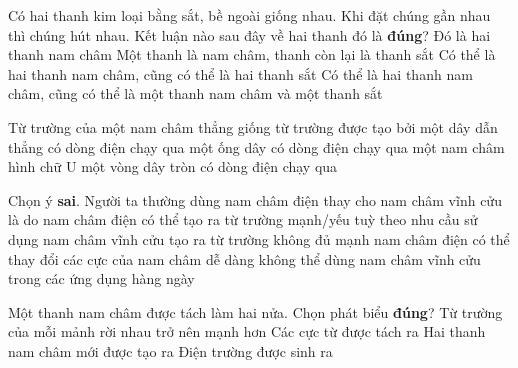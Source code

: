 \begin{ex}
	Có hai thanh kim loại bằng sắt, bề ngoài giống nhau. Khi đặt chúng gần nhau thì chúng hút nhau. Kết luận nào sau đây về hai thanh đó là \textbf{đúng}?
	\choice
	{Đó là hai thanh nam châm}
	{Một thanh là nam châm, thanh còn lại là thanh sắt}
	{Có thể là hai thanh nam châm, cũng có thể là hai thanh sắt}
	{\True Có thể là hai thanh nam châm, cũng có thể là một thanh nam châm và một thanh sắt}
	\loigiai{}
\end{ex}
\begin{ex}
	Từ trường của một nam châm thẳng giống từ trường được tạo bởi
	\choice
	{một dây dẫn thẳng có dòng điện chạy qua}
	{\True một ống dây có dòng điện chạy qua}
	{một nam châm hình chữ U}
	{một vòng dây tròn có dòng điện chạy qua}
	\loigiai{}
\end{ex}
\begin{ex}
	Chọn ý \textbf{sai}. Người ta thường dùng nam châm điện thay cho nam châm vĩnh cửu là do
	\choice
	{nam châm điện có thể tạo ra từ trường mạnh/yếu tuỳ theo nhu cầu sử dụng}
	{nam châm vĩnh cửu tạo ra từ trường không đủ mạnh}
	{nam châm điện có thể thay đổi các cực của nam châm dễ dàng}
	{\True không thể dùng nam châm vĩnh cửu trong các ứng dụng hàng ngày}
	\loigiai{}
\end{ex}
\begin{ex}
	Một thanh nam châm được tách làm hai nửa. Chọn phát biểu \textbf{đúng}?
	\choice
	{Từ trường của mỗi mảnh rời nhau trở nên mạnh hơn}
	{Các cực từ được tách ra}
	{\True Hai thanh nam châm mới được tạo ra}
	{Điện trường được sinh ra}
	\loigiai{}
\end{ex}

